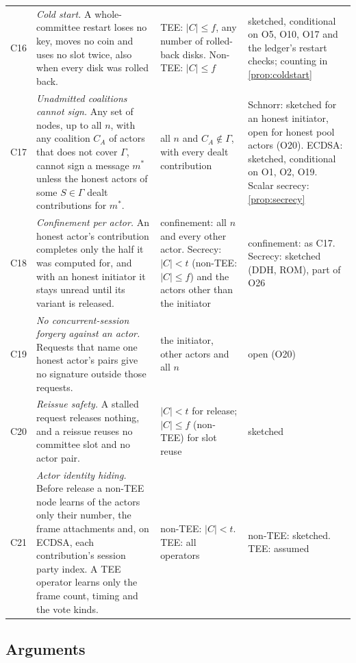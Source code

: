 {\begin{longtable}{@{}>{\raggedright\arraybackslash}p{0.6cm}>{\raggedright\arraybackslash}p{6.3cm}>{\raggedright\arraybackslash}p{3.6cm}>{\raggedright\arraybackslash}p{3.6cm}@{}}
C16 & \emph{Cold start.} A whole-committee restart loses no key, moves no coin and uses no slot twice, also when every disk was rolled back. & TEE: $|C| \le f$, any number of rolled-back disks. Non-TEE: $|C| \le f$ & sketched, conditional on O5, O10, O17 and the ledger's restart checks; counting in \cref{prop:coldstart} \\
C17 & \emph{Unadmitted coalitions cannot sign.} Any set of nodes, up to all $n$, with any coalition $C_A$ of actors that does not cover $\Gamma$, cannot sign a message $m^*$ unless the honest actors of some $S \in \Gamma$ dealt contributions for $m^*$. & all $n$ and $C_A \notin \Gamma$, with every dealt contribution & Schnorr: sketched for an honest initiator, open for honest pool actors (O20). ECDSA: sketched, conditional on O1, O2, O19. Scalar secrecy: \cref{prop:secrecy} \\
C18 & \emph{Confinement per actor.} An honest actor's contribution completes only the half it was computed for, and with an honest initiator it stays unread until its variant is released. & confinement: all $n$ and every other actor. Secrecy: $|C| < t$ (non-TEE: $|C| \le f$) and the actors other than the initiator & confinement: as C17. Secrecy: sketched (DDH, ROM), part of O26 \\
C19 & \emph{No concurrent-session forgery against an actor.} Requests that name one honest actor's pairs give no signature outside those requests. & the initiator, other actors and all $n$ & open (O20) \\
C20 & \emph{Reissue safety.} A stalled request releases nothing, and a reissue reuses no committee slot and no actor pair. & $|C| < t$ for release; $|C| \le f$ (non-TEE) for slot reuse & sketched \\
C21 & \emph{Actor identity hiding.} Before release a non-TEE node learns of the actors only their number, the frame attachments and, on ECDSA, each contribution's session party index. A TEE operator learns only the frame count, timing and the vote kinds. & non-TEE: $|C| < t$. TEE: all operators & non-TEE: sketched. TEE: assumed \\
\end{longtable}
}

\subsection{Arguments}\label{sec:arguments}

